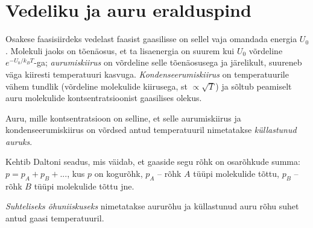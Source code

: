 \documentclass[a4paper,11pt,twocolumn]{article}
\begin{document}
\section{Vedeliku ja auru eralduspind}
Osakese faasisiirdeks vedelast faasist gaasilisse on sellel vaja omandada energia \( U_0 \). Molekuli jaoks on tõenäosus, et ta lisaenergia on suurem kui \( U_0 \) võrdeline \( e^{-U_0/k_BT} \)-ga; \textit{aurumiskiirus} on võrdeline selle tõenäosusega ja järelikult, suureneb väga kiiresti temperatuuri kasvuga. \textit{Kondenseerumiskiirus} on temperatuurile vähem tundlik (võrdeline molekulide kiirusega, st \( \propto \sqrt{T} \)) ja sõltub peamiselt auru molekulide kontsentratsioonist gaasilises olekus.

Auru, mille kontsentratsioon on selline, et selle aurumiskiirus ja kondenseerumiskiirus on võrdsed antud temperatuuril nimetatakse \textit{küllastunud auruks}.

Kehtib Daltoni seadus, mis väidab, et gaaside segu rõhk on osarõhkude summa: \( p=p_A+p_B+... \), kus \( p \) on kogurõhk, \( p_A \) -- rõhk \( A \) tüüpi molekulide tõttu, \( p_B \) -- rõhk \( B \) tüüpi molekulide tõttu jne.

\textit{Suhteliseks õhuniiskuseks} nimetatakse aururõhu ja küllastunud auru rõhu suhet antud gaasi temperatuuril.
\end{document}
